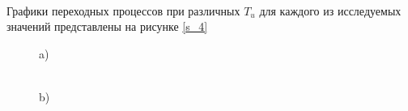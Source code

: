 \documentclass[a4paper,12pt]{article}
\begin{document}
	\paragraph {} Графики переходных процессов при различных $T_u$ для каждого из исследуемых значений представлены на рисунке \ref{s_4}\\
	\begin{figure}[h!]
		\renewcommand{\figurename}{Рисунок}
		\begin{minipage}[h]{0.47\linewidth}
			 a) \\
		\end{minipage}
		\hfill
		\begin{minipage}[h]{0.47\linewidth}
			 \\b)

\end{minipage}
\end{figure}
\end{document}
